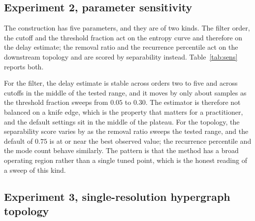\documentclass[10pt,a4paper,twocolumn]{article}
\begin{document}
\subsection{Experiment 2, parameter sensitivity}
\label{sec:exp2}

The construction has five parameters, and they are of two kinds.  The filter
order, the cutoff and the threshold fraction act on the entropy curve and
therefore on the delay estimate; the removal ratio and the recurrence
percentile act on the downstream topology and are scored by separability
instead.  Table~\ref{tab:sens} reports both.

For the filter, the delay estimate is stable across orders two to five and
across cutoffs in the middle of the tested range, and it moves by only about
\sensTauSpan{} samples as the threshold fraction sweeps from $0.05$ to
$0.30$.  The estimator is therefore not balanced on a knife edge, which is
the property that matters for a practitioner, and the default settings sit in
the middle of the plateau.  For the topology, the separability score varies
by \sensCvSpan{} as the removal ratio sweeps the tested range, and the
default of $0.75$ is at or near the best observed value; the recurrence
percentile and the mode count behave similarly.  The pattern is that the
method has a broad operating region rather than a single tuned point, which
is the honest reading of a sweep of this kind.

\begin{table}[t]
\centering
\caption{Parameter sensitivity.  The upper block reports the delay estimate
against the filter parameters, the lower block the downstream separability
score against the topology parameters.}
\label{tab:sens}
\scriptsize

\end{table}

\subsection{Experiment 3, single-resolution hypergraph topology}
\label{sec:exp3}
\end{document}
